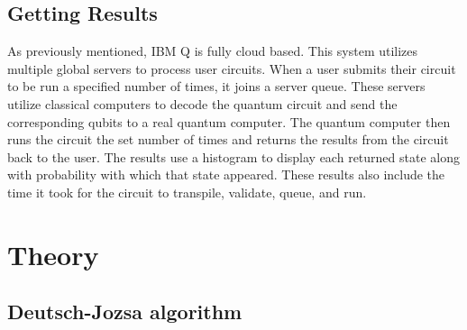 \documentclass[12pt]{article}
\begin{document}
    \subsection{Getting Results}
        As previously mentioned, IBM Q is fully cloud based. This system utilizes multiple global servers to process user circuits. When a user submits their circuit to be run a specified number of times, it joins a server queue. These servers utilize classical computers to decode the quantum circuit and send the corresponding qubits to a real quantum computer. The quantum computer then runs the circuit the set number of times and returns the results from the circuit back to the user. The results use a histogram to display each returned state along with probability with which that state appeared. These results also include the time it took for the circuit to transpile, validate, queue, and run.
        
        
\section{Theory}
    \subsection{Deutsch-Jozsa algorithm}
    
\end{document}
